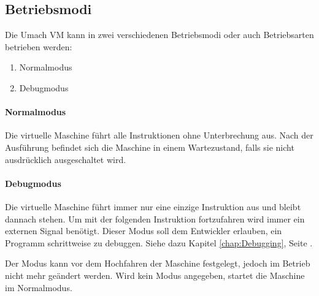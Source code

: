 \subsection{Betriebsmodi}
\label{subsec:Betriebsmodi}

Die Umach VM kann in zwei verschiedenen Betriebsmodi oder auch
Betriebsarten betrieben werden:

\begin{enumerate}
  \item Normalmodus
  \item Debugmodus
\end{enumerate}

\paragraph{Normalmodus} Die virtuelle Maschine führt alle Instruktionen
ohne Unterbrechung aus. Nach der Ausführung befindet sich die Maschine in einem
Wartezustand, falls sie nicht ausdrücklich ausgeschaltet wird.

\paragraph{Debugmodus} Die virtuelle Maschine führt immer nur eine
einzige Instruktion aus und bleibt dannach stehen. Um mit der folgenden
Instruktion fortzufahren wird immer ein externen Signal benötigt.
Dieser Modus soll dem Entwickler erlauben, ein Programm schrittweise zu debuggen.
Siehe dazu Kapitel \ref{chap:Debugging}, Seite \pageref{chap:Debugging}.

Der Modus kann vor dem Hochfahren der Maschine festgelegt, jedoch im
Betrieb nicht mehr geändert werden. Wird kein Modus angegeben, startet die
Maschine im Normalmodus.



